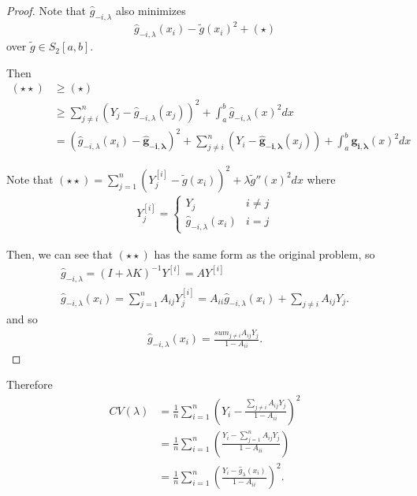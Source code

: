 \begin{proof}
  Note that $\hat g_{-i, \lambda}$ also minimizes
  \begin{equation}
    \label{eq:153}
    \hat g_{-i, \lambda}(x_{i}) - \tilde g(x_{i})^{2} + (\star)
    \tag{$\star \star$}
  \end{equation} over
  $\tilde g \in S_{2}[a, b]$.

  Then
  \begin{align}
    \label{eq:77}
    (\star \star) &\geq (\star) \\
    &\geq \sum_{j \neq i}^{n} (Y_{j} - \hat g_{-i,
      \lambda} (x_{j}))^{2} + \int_{a}^{b} \hat g_{-i,
      \lambda}(x)^{2} dx \\
    &= (\hat g_{-i, \lambda}(x_{i}) - \mathbf{ \hat g_{-i,
        \lambda}})^{2} + \sum_{j \neq i}^{n} (Y_{i} - \mathbf{\hat
      g_{-i, \lambda}}(x_{j})) + \int_{a}^{b} \mathbf{g_{i,
        \lambda}}(x)^{2} dx
  \end{align}

  Note that $(\star \star) = \sum_{j = 1}^{n} (Y^{[i]}_{j} - \tilde
  g(x_{i}))^{2} + \lambda \tilde g''(x)^{2} dx$ where
  \begin{align}
    \label{eq:78}
    Y_{j}^{[i]} =
    \begin{cases}
      Y_{j} & i \neq j \\
      \hat g_{-i, \lambda}(x_{i}) & i = j
    \end{cases}
  \end{align}

  Then, we can see that $(\star \star)$ has the same form as the
  original problem, so
  \begin{align}
    \label{eq:79}
    \hat g_{-i, \lambda} = (I + \lambda K)^{-1} Y^{[i]} = A Y^{[i]} \\
    \hat g_{-i, \lambda}(x_{i}) = \sum_{j=1}^{n} A_{ij} Y_{j}^{[i]} =
    A_{ii} \hat g_{-i, \lambda}(x_{i}) + \sum_{j \neq i} A_{ij} Y_{j}.
  \end{align} and so
  \begin{align}
    \label{eq:155}
    \hat g_{-i, \lambda}(x_{i}) = \frac{sum_{j \neq i} A_{ij} Y_{j}}{1
    - A_{ii}}.
  \end{align}
\end{proof}

Therefore
\begin{align}
  \label{eq:156}
  CV(\lambda) &= \frac{1}{n} \sum_{i=1}^{n} (Y_{i} - \frac{\sum_{j \neq
      i} A_{ij} Y_{j}}{1 - A_{ii}})^{2} \\
  \label{eq:157}
  &= \frac{1}{n} \sum_{i=1}^{n} (\frac{Y_{i} - \sum_{j=1}^{n} A_{ij}
    Y_{j}}{1 - A_{ii}}) \\
  \label{eq:158}
  &= \frac{1}{n} \sum_{i=1}^{n} (\frac{Y_{i} - \hat
    g_{\lambda}(x_{i})}{1 - A_{ii}})^{2}.
\end{align}


